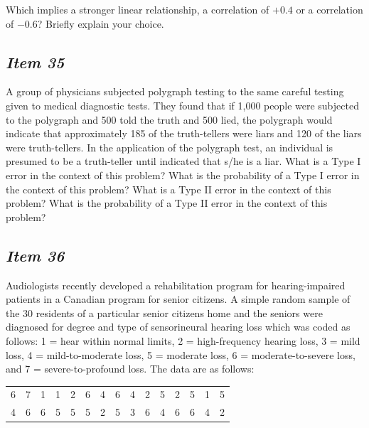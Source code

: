 Which implies a stronger linear relationship, a correlation of $+0.4$ or a correlation of $-0.6$? Briefly explain your choice.





\subsection{\textbf{\textit{Item 35}}}


A group of physicians subjected polygraph testing to the same careful testing given to medical diagnostic tests. They found that if 1,000 people were subjected to the polygraph and 500 told the truth and 500 lied, the polygraph would indicate that approximately 185 of the truth-tellers were liars and 120 of the liars were truth-tellers. In the application of the polygraph test, an individual is presumed to be a truth-teller until indicated that s/he is a liar. What is a Type I error in the context of this problem? What is the probability of a Type I error in the context of this problem? What is a Type II error in the context of this problem? What is the probability of a Type II error in the context of this problem?








\subsection{\textbf{\textit{Item 36}}}


Audiologists recently developed a rehabilitation program for hearing-impaired patients in a Canadian program for senior citizens. A simple random sample of the 30 residents of a particular senior citizens home and the seniors were diagnosed for degree and type of sensorineural hearing loss which was coded as follows: 1 = hear within normal limits, 2 = high-frequency hearing loss, 3 = mild loss, 4 = mild-to-moderate loss, 5 = moderate loss, 6 = moderate-to-severe loss, and 7 = severe-to-profound loss. The data are as follows: 





\begin{table}[!ht]


\begin{center}


\begin{tabular}{lllllllllllllll}


6 & 7 & 1 & 1 & 2 & 6 & 4 & 6 & 4 & 2 & 5 & 2 & 5 & 1& 5\\


4 & 6 & 6 & 5 & 5 & 5 & 2 & 5 & 3 & 6 & 4 & 6 & 6 & 4 & 2\\


\end{tabular}


\end{center}


\end{table}





